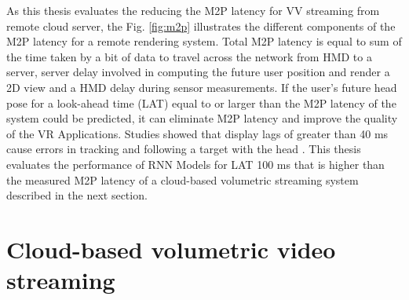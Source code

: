 As this thesis evaluates the reducing the M2P latency for VV streaming from remote cloud server, the Fig. \ref{fig:m2p} illustrates the different components of the M2P latency for a remote rendering system. Total M2P latency is equal to sum of the time taken by a bit of data to travel across the network from HMD to a server, server delay involved in computing the future user position and render a 2D view and a HMD delay during sensor measurements. If the user’s future head pose for a look-ahead time (LAT) equal to or larger than the M2P latency of the system could be predicted, it can eliminate M2P latency and improve the quality of the VR Applications. Studies showed that display lags of greater than 40 ms cause errors in tracking and following a target with the head \cite{delay_sickness}. This thesis evaluates the performance of RNN Models for LAT 100 ms that is higher than the measured M2P latency of a cloud-based volumetric streaming system described in the next section. 

\section{Cloud-based volumetric video streaming}
\label{sec:theorie:cloud}

